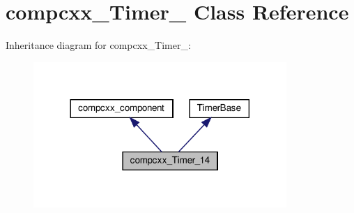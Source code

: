 \hypertarget{classcompcxx__Timer__14}{}\section{compcxx\+\_\+\+Timer\+\_ Class Reference}
\label{classcompcxx__Timer__14}


Inheritance diagram for compcxx\+\_\+\+Timer\+\_\+:\nopagebreak
\begin{figure}[H]
\begin{center}
\leavevmode
\includegraphics[width=272pt]{classcompcxx__Timer__14__inherit__graph}
\end{center}
\end{figure}


